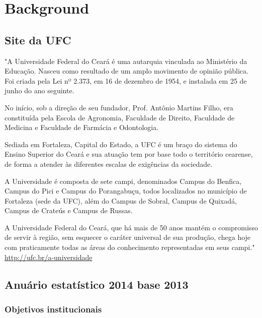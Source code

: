 \documentclass{article}
\begin{document}
\listoftodos

\tableofcontents

\section{Background}

\subsection{Site da UFC}

"A Universidade Federal do Ceará é uma autarquia vinculada ao Ministério da Educação. Nasceu como resultado de um amplo movimento de opinião pública. Foi criada pela Lei nº 2.373, em 16 de dezembro de 1954, e instalada em 25 de junho do ano seguinte.

No início, sob a direção de seu fundador, Prof. Antônio Martins Filho, era constituída pela Escola de Agronomia, Faculdade de Direito, Faculdade de Medicina e Faculdade de Farmácia e Odontologia.

Sediada em Fortaleza, Capital do Estado, a UFC é um braço do sistema do Ensino Superior do Ceará e sua atuação tem por base todo o território cearense, de forma a atender às diferentes escalas de exigências da sociedade.

A Universidade é composta de sete campi, denominados Campus do Benfica, Campus do Pici e Campus do Porangabuçu, todos localizados no município de Fortaleza (sede da UFC), além do Campus de Sobral, Campus de Quixadá, Campus de Crateús e Campus de Russas.

A Universidade Federal do Ceará, que há mais de 50 anos mantém o compromisso de servir à região, sem esquecer o caráter universal de sua produção, chega hoje com praticamente todas as áreas do conhecimento representadas em seus campi." \url{http://ufc.br/a-universidade}

\subsection{Anuário estatístico 2014 base 2013}

\cite{anuario_2014_base_2013}

\subsubsection{Objetivos institucionais}
\end{document}

